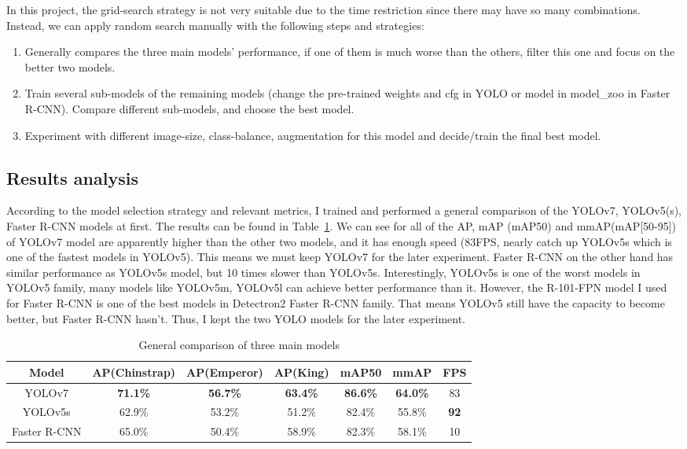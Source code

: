 \documentclass[runningheads]{llncs}
\begin{document}
In this project, the grid-search strategy is not very suitable due to the time restriction since there may have so many combinations. Instead, we can apply random search manually with the following steps and strategies:
\begin{enumerate}
    \item Generally compares the three main models' performance, if one of them is much worse than the others, filter this one and focus on the better two models.
    \item Train several sub-models of the remaining models (change the pre-trained weights and cfg in YOLO or model in model\_zoo in Faster R-CNN). Compare different sub-models, and choose the best model.
    \item Experiment with different image-size, class-balance, augmentation for this model and decide/train the final best model.
\end{enumerate}


\subsection{Results analysis}
According to the model selection strategy and relevant metrics, I trained and performed a general comparison of the YOLOv7, YOLOv5(s), Faster R-CNN models at first. The results can be found in Table~\ref{tab1}. We can see for all of the AP, mAP (mAP50) and mmAP(mAP[50-95]) of YOLOv7 model are apparently higher than the other two models, and it has enough speed (83FPS, nearly catch up YOLOv5s which is one of the fastest models in YOLOv5). This means we must keep YOLOv7 for the later experiment. Faster R-CNN on the other hand has similar performance as YOLOv5s model, but 10 times slower than YOLOv5s. Interestingly, YOLOv5s is one of the worst models in YOLOv5 family, many models like YOLOv5m, YOLOv5l can achieve better performance than it. However, the R-101-FPN model I used for Faster R-CNN is one of the best models in Detectron2 Faster R-CNN family. That means YOLOv5 still have the capacity to become better, but Faster R-CNN hasn't. Thus, I kept the two YOLO models for the later experiment.

\begin{table}
\centering
\caption{General comparison of three main models}\label{tab1}
\begin{tabular}{|c|c|c|c|c|c|c|}
\hline
\textbf{Model} & \textbf{AP(Chinstrap)} & \textbf{AP(Emperor)} & \textbf{AP(King)} & \textbf{mAP50} & \textbf{mmAP} & \textbf{FPS} \\
\hline
YOLOv7 & \textbf{71.1\%} & \textbf{56.7\%} & \textbf{63.4\%} & \textbf{86.6\%} & \textbf{64.0\%} & 83 \\
YOLOv5s & 62.9\% & 53.2\% & 51.2\% & 82.4\% & 55.8\% & \textbf{92} \\
Faster R-CNN & 65.0\% & 50.4\% & 58.9\% & 82.3\% & 58.1\% & 10\\
\hline
\end{tabular}
\end{table}
\end{document}
